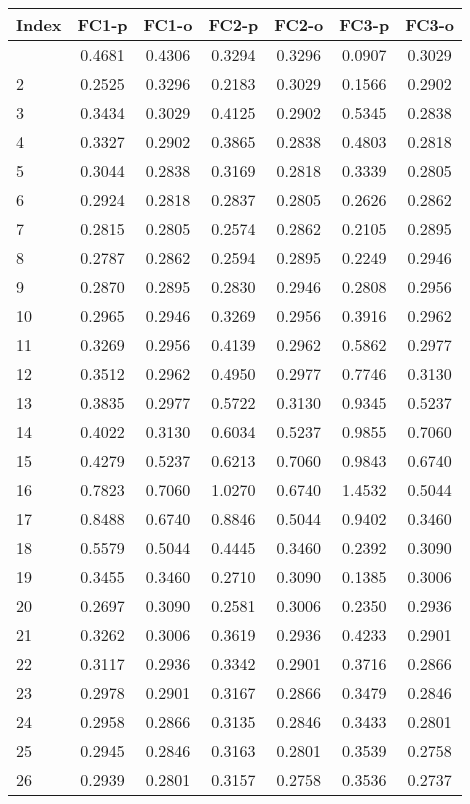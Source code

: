 \begin{center}
\begin{longtable}{lcccccc}
\hline
Index & FC1-p \footnotemark[1] & FC1-o \footnotemark[2] & FC2-p \footnotemark[3] & FC2-o \footnotemark[4] & FC3-p \footnotemark[5] & FC3-o \footnotemark[6] \\
\hline
\endhead
\hline
\endfoot
\hline
\endlastfoot
    1  &0.4681&0.4306&0.3294&0.3296&0.0907&0.3029 \\
    2  &0.2525&0.3296&0.2183&0.3029&0.1566&0.2902 \\
    3  &0.3434&0.3029&0.4125&0.2902&0.5345&0.2838 \\
    4  &0.3327&0.2902&0.3865&0.2838&0.4803&0.2818 \\
    5  &0.3044&0.2838&0.3169&0.2818&0.3339&0.2805 \\
    6  &0.2924&0.2818&0.2837&0.2805&0.2626&0.2862 \\
    7  &0.2815&0.2805&0.2574&0.2862&0.2105&0.2895 \\
    8  &0.2787&0.2862&0.2594&0.2895&0.2249&0.2946 \\
    9  &0.2870&0.2895&0.2830&0.2946&0.2808&0.2956 \\
    10 &0.2965&0.2946&0.3269&0.2956&0.3916&0.2962 \\
    11 &0.3269&0.2956&0.4139&0.2962&0.5862&0.2977 \\
    12 &0.3512&0.2962&0.4950&0.2977&0.7746&0.3130 \\
    13 &0.3835&0.2977&0.5722&0.3130&0.9345&0.5237 \\
    14 &0.4022&0.3130&0.6034&0.5237&0.9855&0.7060 \\
    15 &0.4279&0.5237&0.6213&0.7060&0.9843&0.6740 \\
    16 &0.7823&0.7060&1.0270&0.6740&1.4532&0.5044 \\
    17 &0.8488&0.6740&0.8846&0.5044&0.9402&0.3460 \\
    18 &0.5579&0.5044&0.4445&0.3460&0.2392&0.3090 \\
    19 &0.3455&0.3460&0.2710&0.3090&0.1385&0.3006 \\
    20 &0.2697&0.3090&0.2581&0.3006&0.2350&0.2936 \\
    21 &0.3262&0.3006&0.3619&0.2936&0.4233&0.2901 \\
    22 &0.3117&0.2936&0.3342&0.2901&0.3716&0.2866 \\
    23 &0.2978&0.2901&0.3167&0.2866&0.3479&0.2846 \\
    24 &0.2958&0.2866&0.3135&0.2846&0.3433&0.2801 \\
    25 &0.2945&0.2846&0.3163&0.2801&0.3539&0.2758 \\
    26 &0.2939&0.2801&0.3157&0.2758&0.3536&0.2737 \\

\end{longtable}
\end{center}
